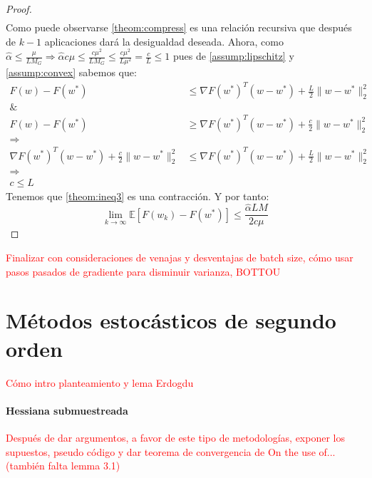 \documentclass{book}
\theoremstyle{plain}
\theoremstyle{definition}
\theoremstyle{remark}
\begin{document}
\begin{proof}
\begin{equation}
\begin{split}
    \end{split}
\end{equation}
Como puede observarse \ref{theom:compress} es una relación recursiva que después de $k-1$ aplicaciones dará la desigualdad deseada. Ahora, como $\hat{\alpha}\leq\frac{\mu}{L M_G}\Rightarrow \hat{\alpha}c\mu\leq \frac{c\mu^2}{LM_G}\leq\frac{c\mu^2}{L\mu^2}=\frac{c}{L}\leq 1$ pues de \ref{assump:lipschitz} y \ref{assump:convex} sabemos que: 
\begin{equation*}
    \begin{split}
    F(w) - F(w^*) & \leq \nabla F(w^*)^T(w-w^*) + \frac{L}{2}\|w - w^*\|_2^2 \\
    \& & \\
    F(w) - F(w^*) & \geq \nabla F(w^*)^T(w-w^*) +  \frac{c}{2}\|w - w^*\|_2^2 \\
    \Rightarrow & \\
    \nabla F(w^*)^T(w-w^*) + \frac{c}{2}\|w - w^*\|_2^2 &\leq \nabla F(w^*)^T(w-w^*) + \frac{L}{2}\|w - w^*\|_2^2 \\
    \Rightarrow & \\
    c \leq L
    \end{split}
\end{equation*}
Tenemos que \ref{theom:ineq3} es una contracción. Y por tanto: \begin{equation}
    \displaystyle\lim_{k\rightarrow\infty}\mathbb{E}[F(w_k)- F(w^*)] \leq \frac{\hat{\alpha}LM}{2c\mu} 
\end{equation}
\end{proof}

\textcolor{red}{Finalizar con consideraciones de venajas y desventajas de batch size, cómo usar pasos pasados de gradiente para disminuir varianza, BOTTOU}


\chapter{Métodos estocásticos de segundo orden}

\newpage

\textcolor{red}{Cómo intro planteamiento y lema Erdogdu}

\subsubsection{Hessiana submuestreada}

\textcolor{red}{Después de dar argumentos, a favor de este tipo de metodologías, exponer los supuestos, pseudo código y dar teorema de convergencia de On the use of... (también falta lemma 3.1)}
\end{document}
